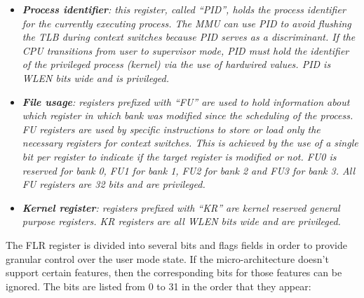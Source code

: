 \documentclass{article}
\begin{document}
\begin{itemize}
                    \item \textit{\textbf{Process identifier}: this register, called ``PID'', holds the process identifier for the currently executing process. The MMU can use PID to avoid flushing the TLB during context switches because PID serves as a discriminant. If the CPU transitions from user to supervisor mode, PID must hold the identifier of the privileged process (kernel) via the use of hardwired values. PID is WLEN bits wide and is privileged.}

                    \item \textit{\textbf{File usage}: registers prefixed with ``FU'' are used to hold information about which register in which bank was modified since the scheduling of the process. FU registers are used by specific instructions to store or load only the necessary registers for context switches. This is achieved by the use of a single bit per register to indicate if the target register is modified or not. FU0 is reserved for bank 0, FU1 for bank 1, FU2 for bank 2 and FU3 for bank 3. All FU registers are 32 bits and are privileged.}

                    \item \textit{\textbf{Kernel register}: registers prefixed with ``KR'' are kernel reserved general purpose registers. KR registers are all WLEN bits wide and are privileged.}

                \end{itemize}

                \vspace{10pt}

                The FLR register is divided into several bits and flags fields in order to provide granular control over the user mode state. If the micro-architecture doesn't support certain features, then the corresponding bits for those features can be ignored. The bits are listed from 0 to 31 in the order that they appear:
\end{document}
